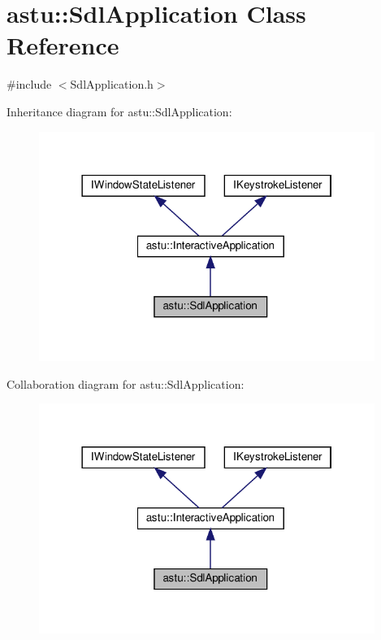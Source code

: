 \hypertarget{classastu_1_1SdlApplication}{}\section{astu\+:\+:Sdl\+Application Class Reference}
\label{classastu_1_1SdlApplication}


{\ttfamily \#include $<$Sdl\+Application.\+h$>$}



Inheritance diagram for astu\+:\+:Sdl\+Application\+:\nopagebreak
\begin{figure}[H]
\begin{center}
\leavevmode
\includegraphics[width=310pt]{classastu_1_1SdlApplication__inherit__graph}
\end{center}
\end{figure}


Collaboration diagram for astu\+:\+:Sdl\+Application\+:\nopagebreak
\begin{figure}[H]
\begin{center}
\leavevmode
\includegraphics[width=310pt]{classastu_1_1SdlApplication__coll__graph}
\end{center}
\end{figure}
